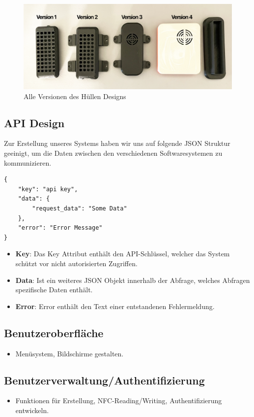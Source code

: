 \documentclass[../main.tex]{subfiles}
\begin{document}
\begin{figure}[!ht]
    \includegraphics[width=\linewidth]{images/huellen_versionen.png}
    \caption{Alle Versionen des Hüllen Designs}
    \centering
\end{figure}

\subsection{API Design} \label{JSON-API}

Zur Erstellung unseres Systems haben wir uns auf folgende JSON Struktur geeinigt, um die Daten zwischen den verschiedenen Softwaresystemen zu kommunizieren. 

\begin{lstlisting}
{
    "key": "api key",
    "data": {
        "request_data": "Some Data"
    },
    "error": "Error Message"
}
\end{lstlisting}

\begin{itemize}
  \item\textbf{Key}: Das Key Attribut enthält den API-Schlüssel, welcher das System schützt vor nicht autorisierten Zugriffen.
  \item\textbf{Data}: Ist ein weiteres JSON Objekt innerhalb der Abfrage, welches Abfragen spezifische Daten enthält.
  \item\textbf{Error}: Error enthält den Text einer entstandenen Fehlermeldung.
\end{itemize}

\subsection{Benutzeroberfläche}
\begin{itemize}
  \item Menüsystem, Bildschirme gestalten.
\end{itemize}

\subsection{Benutzerverwaltung/Authentifizierung}
\begin{itemize}
  \item Funktionen für Erstellung, NFC-Reading/Writing, Authentifizierung entwickeln.
\end{itemize}
\end{document}
